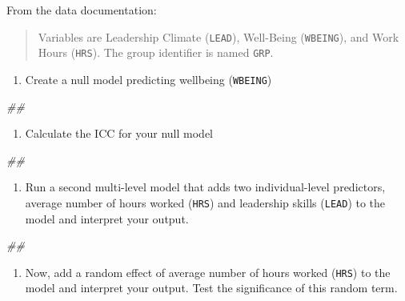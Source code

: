 \documentclass[
]{book}
\newenvironment{Shaded}{\begin{snugshade}}{\end{snugshade}}
\newcommand{\CommentTok}[1]{\textcolor[rgb]{0.56,0.35,0.01}{\textit{#1}}}
\providecommand{\tightlist}{%
  \setlength{\itemsep}{0pt}\setlength{\parskip}{0pt}}
\begin{document}
From the data documentation:

\begin{quote}
Variables are Leadership Climate (\texttt{LEAD}), Well-Being (\texttt{WBEING}), and Work Hours (\texttt{HRS}). The group identifier is named \texttt{GRP}.
\end{quote}

\begin{enumerate}
\def\labelenumi{\arabic{enumi}.}
\tightlist
\item
  Create a null model predicting wellbeing (\texttt{WBEING})
\end{enumerate}

\begin{Shaded}
\begin{Highlighting}[]
\CommentTok{## }
\end{Highlighting}
\end{Shaded}

\begin{enumerate}
\def\labelenumi{\arabic{enumi}.}
\setcounter{enumi}{1}
\tightlist
\item
  Calculate the ICC for your null model
\end{enumerate}

\begin{Shaded}
\begin{Highlighting}[]
\CommentTok{## }
\end{Highlighting}
\end{Shaded}

\begin{enumerate}
\def\labelenumi{\arabic{enumi}.}
\setcounter{enumi}{2}
\tightlist
\item
  Run a second multi-level model that adds two individual-level predictors, average number of hours worked (\texttt{HRS}) and leadership skills (\texttt{LEAD}) to the model and interpret your output.
\end{enumerate}

\begin{Shaded}
\begin{Highlighting}[]
\CommentTok{## }
\end{Highlighting}
\end{Shaded}

\begin{enumerate}
\def\labelenumi{\arabic{enumi}.}
\setcounter{enumi}{3}
\tightlist
\item
  Now, add a random effect of average number of hours worked (\texttt{HRS}) to the model and interpret your output. Test the significance of this random term.
\end{enumerate}
\end{document}
